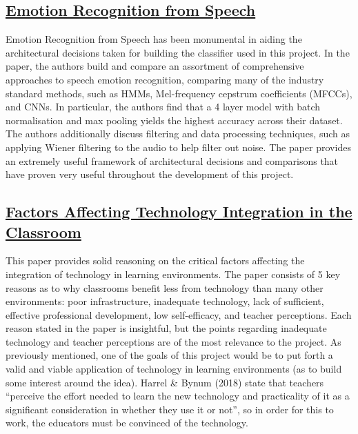 \documentclass[12pt]{article}
\begin{document}
\subsection{\href{https://arxiv.org/pdf/1912.10458.pdf}{Emotion Recognition from Speech}}
Emotion Recognition from Speech has been monumental in aiding the architectural decisions taken for building the classifier used in this project. In the paper, the authors build and compare an assortment of comprehensive approaches to speech emotion recognition, comparing many of the industry standard methods, such as HMMs, Mel-frequency cepstrum coefficients (MFCCs), and CNNs. In particular, the authors find that a 4 layer model with batch normalisation and max pooling yields the highest accuracy across their dataset. The authors additionally discuss filtering and data processing techniques, such as applying Wiener filtering to the audio to help filter out noise. The paper provides an extremely useful framework of architectural decisions and comparisons that have proven very useful throughout the development of this project. 

\subsection{\href{https://files.eric.ed.gov/fulltext/EJ1194723.pdf}{Factors Affecting Technology Integration in the Classroom}}
This paper provides solid reasoning on the critical factors affecting the integration of technology in learning environments. The paper consists of 5 key reasons as to why classrooms benefit less from technology than many other environments: poor infrastructure, inadequate technology, lack of sufficient, effective professional development, low self-efficacy, and teacher perceptions. Each reason stated in the paper is insightful, but the points regarding inadequate technology and teacher perceptions are of the most relevance to the project. As previously mentioned, one of the goals of this project would be to put forth a valid and viable application of technology in learning environments (as to build some interest around the idea). Harrel \& Bynum (2018) state that teachers ``perceive the effort needed to learn the new technology and practicality of it as a significant consideration in whether they use it or not'', so in order for this to work, the educators must be convinced of the technology.
\end{document}
